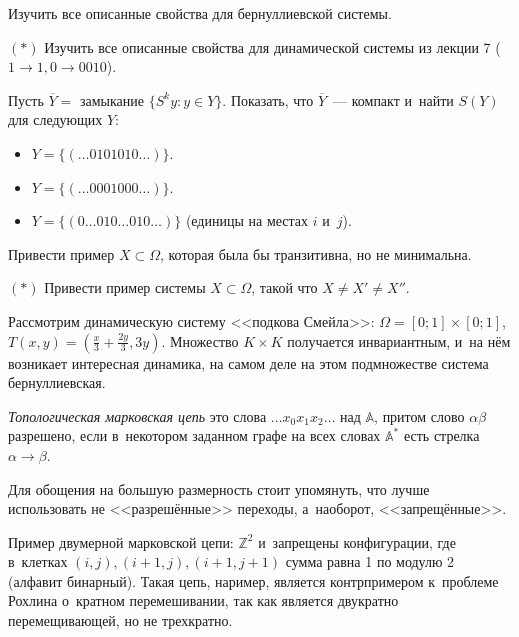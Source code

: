 \documentclass{article}
\begin{document}
\begin{exercise}
	Изучить все описанные свойства для бернуллиевской системы.
\end{exercise}
\begin{exercise}$(\ast)$ Изучить все описанные свойства для динамической
	системы из лекции 7 ($1 \rightarrow 1, 0 \rightarrow 0010$).
\end{exercise}
\begin{exercise} Пусть $\overline{Y} =$ замыкание $\{S^k y: y \in Y\}$.
	Показать, что $\overline{Y}$~--- компакт и~найти $S(Y)$ для следующих $Y$:
	\begin{itemize}
		\item $Y = \{(\ldots 0101010 \ldots)\}$.
		\item $Y = \{(\ldots 0001000 \ldots)\}$.
		\item $Y = \{(0\ldots010\ldots010\ldots)\}$ (единицы на местах $i$ и~$j$).
	\end{itemize}
\end{exercise}
\begin{exercise}
	Привести пример $X \subset \Omega$, которая была бы транзитивна, но не
	минимальна.
\end{exercise}
\begin{exercise}$(\ast)$
	Привести пример системы $X \subset \Omega$, такой что $X \ne X' \ne X''$.
\end{exercise}

Рассмотрим динамическую систему <<подкова Смейла>>: $\Omega = [0; 1] \times [0;
1]$, $T(x, y) = (\frac{x}{3} + \frac{2y}{3}, 3y)$. Множество $K \times K$
получается инвариантным, и~на нём возникает интересная динамика, на самом деле
на этом подмножестве система бернуллиевская.

\begin{definition}
	\emph{Топологическая марковская цепь} это слова $\ldots x_0 x_1 x_2 \ldots$
	над $\mathbb{A}$, притом слово $\alpha \beta$ разрешено, если в~некотором
	заданном графе на всех словах $\mathbb{A}^\ast$ есть стрелка $\alpha
	\rightarrow \beta$.

	Для обощения на большую размерность стоит упомянуть, что лучше использовать не
	<<разрешённые>> переходы, а~наоборот, <<запрещённые>>.
\end{definition}

Пример двумерной марковской цепи: $\mathbb{Z}^2$ и~запрещены конфигурации, где
в~клетках $(i,j), (i+1,j), (i+1,j+1)$ сумма равна 1 по модулю 2 (алфавит
бинарный). Такая цепь, наример, является контрпримером к~проблеме Рохлина
о~кратном перемешивании, так как является двукратно перемещивающей, но не
трехкратно.
\end{document}
